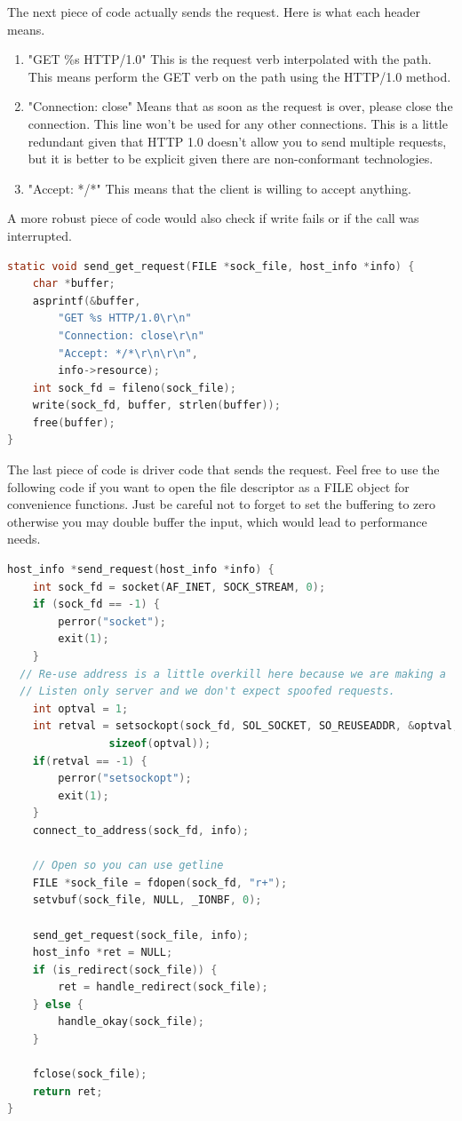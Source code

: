 The next piece of code actually sends the request. Here is what each header means.

\begin{enumerate}
  \item "GET \%s HTTP/1.0" This is the request verb interpolated with the path. This means perform the GET verb on the path using the HTTP/1.0 method.
  \item "Connection: close" Means that as soon as the request is over, please close the connection. This line won't be used for any other connections.
    This is a little redundant given that HTTP 1.0 doesn't allow you to send multiple requests, but it is better to be explicit given there are non-conformant technologies.
  \item "Accept: */*" This means that the client is willing to accept anything.
\end{enumerate}

A more robust piece of code would also check if write fails or if the call was interrupted.

\begin{lstlisting}[language=C]
static void send_get_request(FILE *sock_file, host_info *info) {
	char *buffer;
	asprintf(&buffer,
		"GET %s HTTP/1.0\r\n"
		"Connection: close\r\n"
		"Accept: */*\r\n\r\n",
		info->resource);
	int sock_fd = fileno(sock_file);
	write(sock_fd, buffer, strlen(buffer));
	free(buffer);
}
\end{lstlisting}

The last piece of code is driver code that sends the request.
Feel free to use the following code if you want to open the file descriptor as a FILE object for convenience functions.
Just be careful not to forget to set the buffering to zero otherwise you may double buffer the input, which would lead to performance needs.

\begin{lstlisting}[language=C]
host_info *send_request(host_info *info) {
	int sock_fd = socket(AF_INET, SOCK_STREAM, 0);
	if (sock_fd == -1) {
		perror("socket");
		exit(1);
	}
  // Re-use address is a little overkill here because we are making a
  // Listen only server and we don't expect spoofed requests.
	int optval = 1;
	int retval = setsockopt(sock_fd, SOL_SOCKET, SO_REUSEADDR, &optval,
				sizeof(optval));
	if(retval == -1) {
		perror("setsockopt");
		exit(1);
	}
	connect_to_address(sock_fd, info);

	// Open so you can use getline
	FILE *sock_file = fdopen(sock_fd, "r+");
	setvbuf(sock_file, NULL, _IONBF, 0);

	send_get_request(sock_file, info);
	host_info *ret = NULL;
	if (is_redirect(sock_file)) {
		ret = handle_redirect(sock_file);
	} else {
		handle_okay(sock_file);
	}

	fclose(sock_file);
	return ret;
}
\end{lstlisting}

